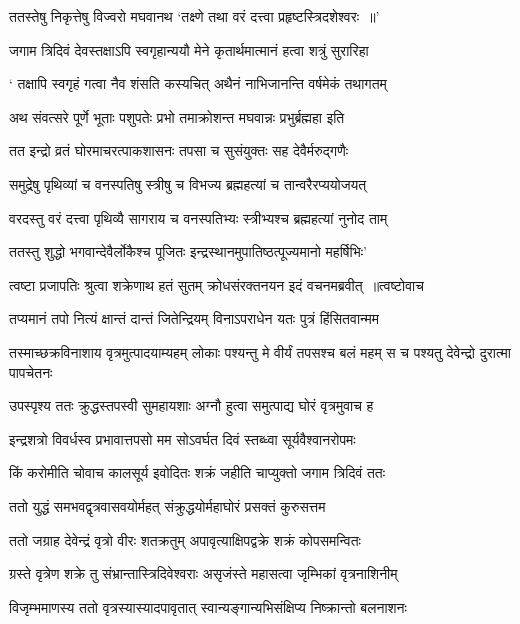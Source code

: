 \twolineshloka
{ततस्तेषु निकृत्तेषु विज्वरो मघवानथ}
{`तक्ष्णे तथा वरं दत्त्वा प्रहृष्टस्त्रिदशेश्वरः ॥'}


\twolineshloka
{जगाम त्रिदिवं देवस्तक्षाऽपि स्वगृहान्ययौ}
{मेने कृतार्थमात्मानं हत्वा शत्रुं सुरारिहा}


\twolineshloka
{` तक्षापि स्वगृहं गत्वा नैव शंसति कस्यचित्}
{अथैनं नाभिजानन्ति वर्षमेकं तथागतम्}


\threelineshloka
{अथ संवत्सरे पूर्णे भूताः पशुपतेः प्रभो}
{तमाक्रोशन्त मघवान्नः प्रभुर्ब्रह्महा इति}
{}


\twolineshloka
{तत इन्द्रो व्रतं घोरमाचरत्पाकशासनः}
{तपसा च सुसंयुक्तः सह देवैर्मरुद्गणैः}


\twolineshloka
{समुद्रेषु पृथिव्यां च वनस्पतिषु स्त्रीषु च}
{विभज्य ब्रह्महत्यां च तान्वरैरप्ययोजयत्}


\twolineshloka
{वरदस्तु वरं दत्त्वा पृथिव्यै सागराय च}
{वनस्पतिभ्यः स्त्रीभ्यश्च ब्रह्महत्यां नुनोद ताम्}


\twolineshloka
{ततस्तु शुद्धो भगवान्देवैर्लोकैश्च पूजितः}
{इन्द्रस्थानमुपातिष्ठत्पूज्यमानो महर्षिभिः'}


\threelineshloka
{त्वष्टा प्रजापतिः श्रुत्वा शक्रेणाथ हतं सुतम्}
{क्रोधसंरक्तनयन इदं वचनमब्रवीत् ॥त्वष्टोवाच}
{}


\twolineshloka
{तप्यमानं तपो नित्यं क्षान्तं दान्तं जितेन्द्रियम्}
{विनाऽपराधेन यतः पुत्रं हिंसितवान्मम}


\threelineshloka
{तस्माच्छक्रविनाशाय वृत्रमुत्पादयाम्यहम्}
{लोकाः पश्यन्तु मे वीर्यं तपसश्च बलं महम्}
{स च पश्यतु देवेन्द्रो दुरात्मा पापचेतनः}


\twolineshloka
{उपस्पृश्य ततः क्रुद्धस्तपस्वी सुमहायशाः}
{अग्नौ हुत्वा समुत्पाद्य घोरं वृत्रमुवाच ह}


\twolineshloka
{इन्द्रशत्रो विवर्धस्व प्रभावात्तपसो मम}
{सोऽवर्घत दिवं स्तब्ध्वा सूर्यवैश्वानरोपमः}


\twolineshloka
{किं करोमीति चोवाच कालसूर्य इवोदितः}
{शक्रं जहीति चाप्युक्तो जगाम त्रिदिवं ततः}


\twolineshloka
{ततो युद्धं समभवद्वृत्रवासवयोर्महत्}
{संक्रुद्धयोर्महाघोरं प्रसक्तं कुरुसत्तम}


\twolineshloka
{ततो जग्राह देवेन्द्रं वृत्रो वीरः शतक्रतुम्}
{अपावृत्याक्षिपद्वक्रे शक्रं कोपसमन्वितः}


\twolineshloka
{ग्रस्ते वृत्रेण शक्रे तु संभ्रान्तास्त्रिदिवेश्वराः}
{असृजंस्ते महासत्वा जृम्भिकां वृत्रनाशिनीम्}


\twolineshloka
{विजृम्भमाणस्य ततो वृत्रस्यास्यादपावृतात्}
{स्वान्यङ्गान्यभिसंक्षिप्य निष्क्रान्तो बलनाशनः}


